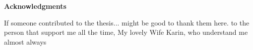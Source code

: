 \clearemptydoublepage
{}
{}	



\vspace*{2cm}

\begin{center}
{\Large \bf Acknowledgments}
\end{center}

\vspace{1cm}




If someone contributed to the thesis... might be good to thank them here.
to the person that support me all the time, My lovely Wife Karin, who understand me
almost always